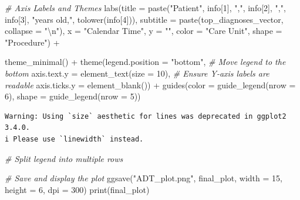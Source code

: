 \documentclass[
]{article}
\newenvironment{Shaded}{\begin{snugshade}}{\end{snugshade}}
\newcommand{\AttributeTok}[1]{\textcolor[rgb]{0.77,0.63,0.00}{#1}}
\newcommand{\CommentTok}[1]{\textcolor[rgb]{0.56,0.35,0.01}{\textit{#1}}}
\newcommand{\DecValTok}[1]{\textcolor[rgb]{0.00,0.00,0.81}{#1}}
\newcommand{\FunctionTok}[1]{\textcolor[rgb]{0.00,0.00,0.00}{#1}}
\newcommand{\NormalTok}[1]{\textcolor[rgb]{0.00,0.00,0.00}{#1}}
\newcommand{\SpecialCharTok}[1]{\textcolor[rgb]{0.00,0.00,0.00}{#1}}
\newcommand{\StringTok}[1]{\textcolor[rgb]{0.31,0.60,0.02}{#1}}
\begin{document}
\begin{Shaded}
\begin{Highlighting}[]
  \CommentTok{\# Axis Labels and Themes}
  \FunctionTok{labs}\NormalTok{(}\AttributeTok{title =} \FunctionTok{paste}\NormalTok{(}\StringTok{"Patient"}\NormalTok{, info[}\DecValTok{1}\NormalTok{], }\StringTok{","}\NormalTok{, }
\NormalTok{                     info[}\DecValTok{2}\NormalTok{], }\StringTok{","}\NormalTok{, info[}\DecValTok{3}\NormalTok{], }\StringTok{"years old,"}\NormalTok{,}
                     \FunctionTok{tolower}\NormalTok{(info[}\DecValTok{4}\NormalTok{])),}
       \AttributeTok{subtitle =} \FunctionTok{paste}\NormalTok{(top\_diagnoses\_vector, }\AttributeTok{collapse =} \StringTok{"}\SpecialCharTok{\textbackslash{}n}\StringTok{"}\NormalTok{),}
       \AttributeTok{x =} \StringTok{"Calendar Time"}\NormalTok{,}
       \AttributeTok{y =} \StringTok{""}\NormalTok{,}
       \AttributeTok{color =} \StringTok{"Care Unit"}\NormalTok{,}
       \AttributeTok{shape =} \StringTok{"Procedure"}\NormalTok{) }\SpecialCharTok{+}
  
  \FunctionTok{theme\_minimal}\NormalTok{() }\SpecialCharTok{+}
  \FunctionTok{theme}\NormalTok{(}\AttributeTok{legend.position =} \StringTok{"bottom"}\NormalTok{,  }\CommentTok{\# Move legend to the bottom}
        \AttributeTok{axis.text.y =} \FunctionTok{element\_text}\NormalTok{(}\AttributeTok{size =} \DecValTok{10}\NormalTok{),  }
        \CommentTok{\# Ensure Y{-}axis labels are readable}
        \AttributeTok{axis.ticks.y =} \FunctionTok{element\_blank}\NormalTok{()) }\SpecialCharTok{+}
  \FunctionTok{guides}\NormalTok{(}\AttributeTok{color =} \FunctionTok{guide\_legend}\NormalTok{(}\AttributeTok{nrow =} \DecValTok{6}\NormalTok{), }\AttributeTok{shape =} \FunctionTok{guide\_legend}\NormalTok{(}\AttributeTok{nrow =} \DecValTok{5}\NormalTok{))  }
\end{Highlighting}
\end{Shaded}

\begin{verbatim}
Warning: Using `size` aesthetic for lines was deprecated in ggplot2 3.4.0.
i Please use `linewidth` instead.
\end{verbatim}

\begin{Shaded}
\begin{Highlighting}[]
\CommentTok{\# Split legend into multiple rows}

\CommentTok{\# Save and display the plot}
\FunctionTok{ggsave}\NormalTok{(}\StringTok{"ADT\_plot.png"}\NormalTok{, final\_plot, }\AttributeTok{width =} \DecValTok{15}\NormalTok{, }\AttributeTok{height =} \DecValTok{6}\NormalTok{, }\AttributeTok{dpi =} \DecValTok{300}\NormalTok{)}
\FunctionTok{print}\NormalTok{(final\_plot)}
\end{Highlighting}
\end{Shaded}
\end{document}
